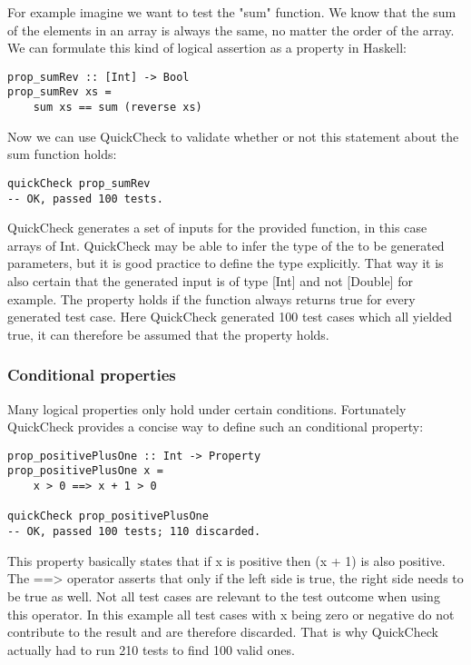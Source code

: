 \documentclass[a4paper, 12pt]{article} %
\begin{document}
For example imagine we want to test the "sum" function. We know that the sum of the elements in an array is always the same, no matter the order of the array. We can formulate this kind of logical assertion as a property in Haskell:

\begin{verbatim}
prop_sumRev :: [Int] -> Bool
prop_sumRev xs = 
    sum xs == sum (reverse xs)
\end{verbatim}

Now we can use QuickCheck to validate whether or not this statement about the sum function holds:

\begin{verbatim}
quickCheck prop_sumRev
-- OK, passed 100 tests.
\end{verbatim}

QuickCheck generates a set of inputs for the provided function, in this case arrays of Int. QuickCheck may be able to infer the type of the to be generated parameters, but it is good practice to define the type explicitly. That way it is also certain that the generated input is of type [Int] and not [Double] for example. The property holds if the function always returns true for every generated test case. \cite{Claessen2000} Here QuickCheck generated 100 test cases which all yielded true, it can therefore be assumed that the property holds.

\subsubsection{Conditional properties}

Many logical properties only hold under certain conditions. Fortunately QuickCheck provides a concise way to define such an conditional property:

\begin{verbatim}
prop_positivePlusOne :: Int -> Property
prop_positivePlusOne x = 
    x > 0 ==> x + 1 > 0

quickCheck prop_positivePlusOne  
-- OK, passed 100 tests; 110 discarded.
\end{verbatim}

This property basically states that if x is positive then (x + 1) is also positive. The ==> operator asserts that only if the left side is true, the right side needs to be true as well. \cite{Claessen2000} Not all test cases are relevant to the test outcome when using this operator. In this example all test cases with x being zero or negative do not contribute to the result and are therefore discarded. That is why QuickCheck actually had to run 210 tests to find 100 valid ones.  
\end{document}
